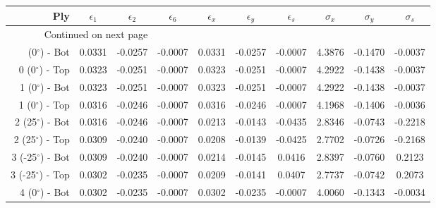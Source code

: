 \begin{table}[H]
\caption{Strains and stresses. Stresses are in [GPa].}
\begin{longtable}{rccccccccc}

\toprule
Ply &  $\epsilon_1$ &  $\epsilon_2$ &  $\epsilon_6$ &  $\epsilon_x$ &  $\epsilon_y$ &  $\epsilon_s$ &  $\sigma_x$ &  $\sigma_y$ &  $\sigma_s$ \\
\midrule
\endhead
\midrule
\multicolumn{3}{r}{{Continued on next page}} \\
\midrule
\endfoot

\bottomrule
\endlastfoot
0 (0$^\circ$) - Bot   &        0.0331 &       -0.0257 &       -0.0007 &        0.0331 &       -0.0257 &       -0.0007 &      4.3876 &     -0.1470 &     -0.0037 \\
0 (0$^\circ$) - Top   &        0.0323 &       -0.0251 &       -0.0007 &        0.0323 &       -0.0251 &       -0.0007 &      4.2922 &     -0.1438 &     -0.0037 \\ \midrule
1 (0$^\circ$) - Bot   &        0.0323 &       -0.0251 &       -0.0007 &        0.0323 &       -0.0251 &       -0.0007 &      4.2922 &     -0.1438 &     -0.0037 \\
1 (0$^\circ$) - Top   &        0.0316 &       -0.0246 &       -0.0007 &        0.0316 &       -0.0246 &       -0.0007 &      4.1968 &     -0.1406 &     -0.0036 \\ \midrule
2 (25$^\circ$) - Bot  &        0.0316 &       -0.0246 &       -0.0007 &        0.0213 &       -0.0143 &       -0.0435 &      2.8346 &     -0.0743 &     -0.2218 \\
2 (25$^\circ$) - Top  &        0.0309 &       -0.0240 &       -0.0007 &        0.0208 &       -0.0139 &       -0.0425 &      2.7702 &     -0.0726 &     -0.2168 \\ \midrule
3 (-25$^\circ$) - Bot &        0.0309 &       -0.0240 &       -0.0007 &        0.0214 &       -0.0145 &        0.0416 &      2.8397 &     -0.0760 &      0.2123 \\
3 (-25$^\circ$) - Top &        0.0302 &       -0.0235 &       -0.0007 &        0.0209 &       -0.0141 &        0.0407 &      2.7737 &     -0.0742 &      0.2073 \\ \midrule
4 (0$^\circ$) - Bot   &        0.0302 &       -0.0235 &       -0.0007 &        0.0302 &       -0.0235 &       -0.0007 &      4.0060 &     -0.1343 &     -0.0034 \\

\end{longtable}
\end{table}
